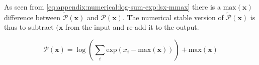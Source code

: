 As seen from \eqref{eq:appendix:numerical:log-sum-exp:lsx-mmax} there is a $\mathrm{max}(\mathbf{x})$ difference between $\tilde{\mathcal{P}}(\mathbf{x})$ and $\mathcal{P}(\mathbf{x})$. The numerical stable version of $\tilde{\mathcal{P}}(\mathbf{x})$ is thus to subtract $(\mathbf{x}$ from the input and re-add it to the output.

\begin{equation}
\mathcal{P}(\mathbf{x}) = \log\left(\sum_i \mathrm{exp}(x_i - \mathrm{max}(\mathbf{x}))\right) + \mathrm{max}(\mathbf{x})
\end{equation}

